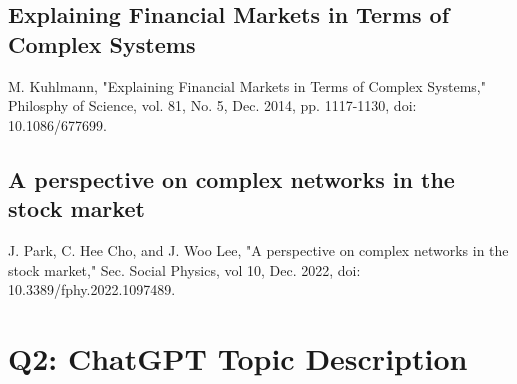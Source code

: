 \documentclass[12pt]{article}
\begin{document}
\subsection{Explaining Financial Markets in Terms of Complex Systems}
M. Kuhlmann, "Explaining Financial Markets in Terms of Complex Systems," Philosphy of Science, vol. 81, No. 5, Dec. 2014, pp. 1117-1130, doi: 10.1086/677699.

\subsection{A perspective on complex networks in the stock market}
J. Park, C. Hee Cho, and J. Woo Lee, "A perspective on complex networks in the stock market," Sec. Social Physics, vol 10, Dec. 2022, doi: 10.3389/fphy.2022.1097489.


\section{Q2: ChatGPT Topic Description}


\end{document}
